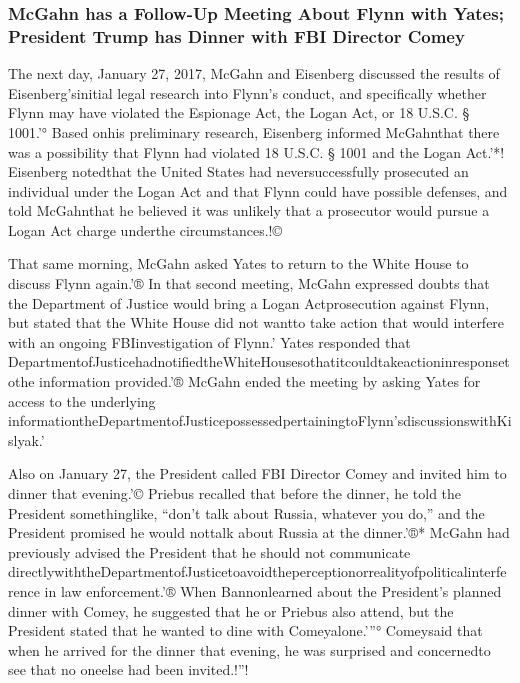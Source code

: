 \subsubsection{McGahn has a Follow-Up Meeting About Flynn with Yates; President Trump has Dinner with FBI Director Comey}

The next day, January 27, 2017, McGahn and Eisenberg discussed the results of Eisenberg’sinitial legal research into Flynn’s conduct, and specifically whether Flynn may have violated the Espionage Act, the Logan Act, or 18 U.S.C. § 1001.'°
Based onhis preliminary research, Eisenberg informed McGahnthat there was a possibility that Flynn had violated 18 U.S.C. § 1001 and the Logan Act.'*!
Eisenberg notedthat the United States had neversuccessfully prosecuted an individual under the Logan Act and that Flynn could have possible defenses, and told McGahnthat he believed it was unlikely that a prosecutor would pursue a Logan Act charge underthe circumstances.!©

That same morning, McGahn asked Yates to return to the White House to discuss Flynn again.'®
In that second meeting, McGahn expressed doubts that the Department of Justice would bring a Logan Actprosecution against Flynn, but stated that the White House did not wantto take action that would interfere with an ongoing FBIinvestigation of Flynn.'
Yates responded that DepartmentofJusticehadnotifiedtheWhiteHousesothatitcouldtakeactioninresponsetothe information provided.'®
McGahn ended the meeting by asking Yates for access to the underlying informationtheDepartmentofJusticepossessedpertainingtoFlynn’sdiscussionswithKislyak.'%

Also on January 27, the President called FBI Director Comey and invited him to dinner that evening.'©
Priebus recalled that before the dinner, he told the President somethinglike, “don’t talk about Russia, whatever you do,” and the President promised he would nottalk about Russia at the dinner.'®*
McGahn had previously advised the President that he should not communicate directlywiththeDepartmentofJusticetoavoidtheperceptionorrealityofpoliticalinterference in law enforcement.'®
When Bannonlearned about the President’s planned dinner with Comey, he suggested that he or Priebus also attend, but the President stated that he wanted to dine with Comeyalone.'”°
Comeysaid that when he arrived for the dinner that evening, he was surprised and concernedto see that no oneelse had been invited.!”!

